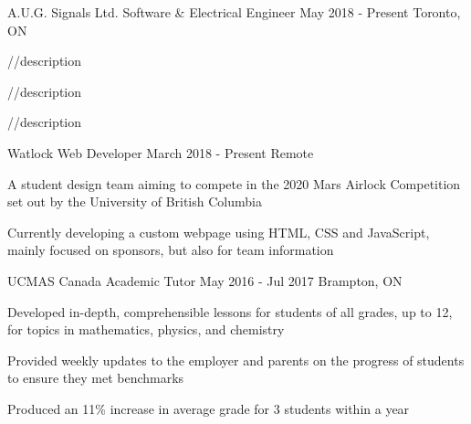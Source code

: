 \begin{cventries}
  \cventry
    {A.U.G. Signals Ltd.}
    {Software \& Electrical Engineer}
    {May 2018 - Present}
    {Toronto, ON}
    {
      \begin{cvitems}
        \item {//description}
        \item {//description}
        \item {//description}
      \end{cvitems}
    }
 \cventry
    {Watlock}
    {Web Developer}
    {March 2018 - Present}
    {Remote}
    {
      \begin{cvitems}
        \item {A student design team aiming to compete in the 2020 Mars Airlock Competition set out by the University of British Columbia}
        \item {Currently developing a custom webpage using HTML, CSS and JavaScript, mainly focused on sponsors, but also for team information}
      \end{cvitems}
    }
  \cventry
    {UCMAS Canada}
    {Academic Tutor}
    {May 2016 - Jul 2017}
    {Brampton, ON}
    {
      \begin{cvitems}
        \item {Developed in-depth, comprehensible lessons for students of all grades, up to 12, for topics in mathematics, physics, and chemistry}
        \item {Provided weekly updates to the employer and parents on the progress of students to ensure they met benchmarks}
	\item{Produced an 11\% increase in average grade for 3 students within a year}
      \end{cvitems}
    }
\end{cventries}
